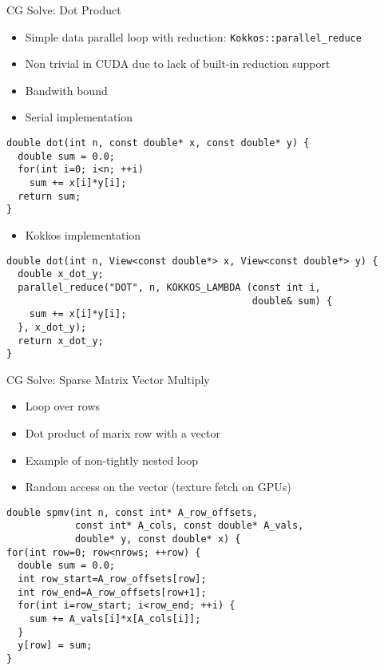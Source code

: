 \begin{frame}[fragile]{CG Solve: Dot Product}
\begin{itemize}
        \item Simple data parallel loop with reduction: \texttt{Kokkos::parallel\_reduce}
        \item Non trivial in CUDA due to lack of built-in reduction support
        \item Bandwith bound
        \item Serial implementation
\end{itemize}
\vspace{-10pt}
\begin{lstlisting}
double dot(int n, const double* x, const double* y) {
  double sum = 0.0;
  for(int i=0; i<n; ++i)
    sum += x[i]*y[i];
  return sum;
}
\end{lstlisting}
\vspace{-10pt}
\begin{itemize}
        \item Kokkos implementation
\end{itemize}
\vspace{-10pt}
\begin{lstlisting}
double dot(int n, View<const double*> x, View<const double*> y) {
  double x_dot_y;
  parallel_reduce("DOT", n, KOKKOS_LAMBDA (const int i,
                                           double& sum) {
    sum += x[i]*y[i];
  }, x_dot_y);
  return x_dot_y;
}
\end{lstlisting}
\end{frame}

\begin{frame}[fragile]{CG Solve: Sparse Matrix Vector Multiply}
\begin{itemize}
        \item Loop over rows
        \item Dot product of marix row with a vector
        \item Example of non-tightly nested loop
        \item Random access on the vector (texture fetch on GPUs)
\end{itemize}
\begin{lstlisting}
double spmv(int n, const int* A_row_offsets,
            const int* A_cols, const double* A_vals,
            double* y, const double* x) {
for(int row=0; row<nrows; ++row) {
  double sum = 0.0;
  int row_start=A_row_offsets[row];
  int row_end=A_row_offsets[row+1];
  for(int i=row_start; i<row_end; ++i) {
    sum += A_vals[i]*x[A_cols[i]];
  }
  y[row] = sum;
}
\end{lstlisting}
\end{frame}

